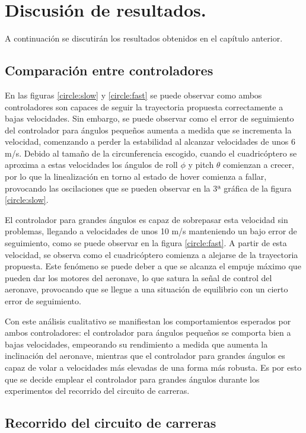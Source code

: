 \chapter{Discusión de resultados.}

A continuación se discutirán los resultados obtenidos en el capítulo anterior.

\section{Comparación entre controladores}

En las figuras \ref{circle:slow} y \ref{circle:fast} se puede observar como ambos controladores son capaces de seguir la trayectoria propuesta correctamente a bajas velocidades. Sin embargo, se puede observar como el error de seguimiento del controlador para ángulos pequeños aumenta a medida que se incrementa la velocidad, comenzando a perder la estabilidad al alcanzar velocidades de unos 6 m/s. Debido al tamaño de la circunferencia escogido, cuando el cuadricóptero se aproxima a estas velocidades los ángulos de roll $\phi $ y pitch $\theta$ comienzan a crecer, por lo que la linealización en torno al estado de hover comienza a fallar, provocando las oscilaciones que se pueden observar en la 3ª gráfica de la figura \ref{circle:slow}.

El controlador para grandes ángulos es capaz de sobrepasar esta velocidad sin problemas, llegando a velocidades de unos 10 m/s manteniendo un bajo error de seguimiento, como se puede observar en la figura \ref{circle:fast}. A partir de esta velocidad, se observa como el cuadricóptero comienza a alejarse de la trayectoria propuesta. Este fenómeno se puede deber a que se alcanza el empuje máximo que pueden dar los motores del aeronave, lo que satura la señal de control del aeronave, provocando que se llegue a una situación de equilibrio con un cierto error de seguimiento. 

Con este análisis cualitativo se manifiestan los comportamientos esperados por ambos controladores: el controlador para ángulos pequeños se comporta bien a bajas velocidades, empeorando su rendimiento a medida que aumenta la inclinación del aeronave, mientras que el controlador para grandes ángulos es capaz de volar a velocidades más elevadas de una forma más robusta. Es por esto que se decide emplear el controlador para grandes ángulos durante los experimentos del recorrido del circuito de carreras.

\section{Recorrido del circuito de carreras}

